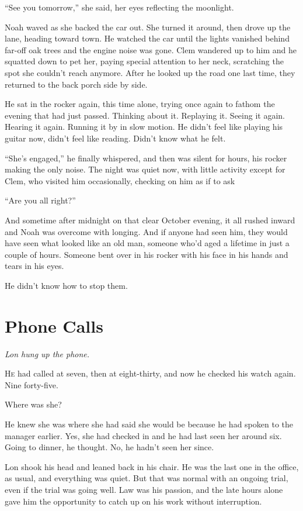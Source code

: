 \documentclass[10pt, twoside, openright]{book}
\newcommand{\chapterornament}[1]{\def\currentornament{#1}}
\def\currentornament{}
\begin{document}
``See you tomorrow,'' she said, her eyes reflecting the moonlight.


Noah waved as she backed the car out. She turned it around, then drove
up the lane, heading toward town. He watched the car until the lights
vanished behind far-off oak trees and the engine noise was gone. Clem
wandered up to him and he squatted down to pet her, paying special
attention to her neck, scratching the spot she couldn't reach anymore.
After he looked up the road one last time, they returned to the back
porch side by side.

He sat in the rocker again, this time alone, trying once again to fathom
the evening that had just passed. Thinking about it. Replaying it.
Seeing it again. Hearing it again. Running it by in slow motion. He
didn't feel like playing his guitar now, didn't feel like reading.
Didn't know what he felt.

``She's engaged,'' he finally whispered, and then was silent for hours,
his rocker making the only noise. The night was quiet now, with little
activity except for Clem, who visited him occasionally, checking on him
as if to ask

``Are you all right?''

And sometime after midnight on that clear October evening, it all rushed
inward and Noah was overcome with longing. And if anyone had seen him,
they would have seen what looked like an old man, someone who'd aged a
lifetime in just a couple of hours. Someone bent over in his rocker with
his face in his hands and tears in his eyes.


He didn't know how to stop them.


\chapterornament{89}
	\chapter{Phone Calls}

\textit{Lon hung up the phone.\\}

\lettrine[findent=0.5em, nindent=0.0em]{H}{e} had called at seven, then at eight-thirty, and now he checked his
watch again. Nine forty-five.


Where was she?


He knew she was where she had said she would be because he had spoken to
the manager earlier. Yes, she had checked in and he had last seen her
around six. Going to dinner, he thought. No, he hadn't seen her since.

Lon shook his head and leaned back in his chair. He was the last one in
the office, as usual, and everything was quiet. But that was normal with
an ongoing trial, even if the trial was going well. Law was his passion,
and the late hours alone gave him the opportunity to catch up on his
work without interruption.
\end{document}
